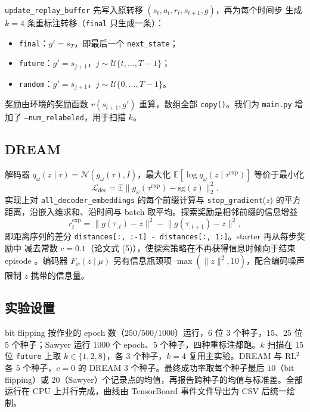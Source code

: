 \documentclass[10pt,twocolumn,a4paper]{ctexart}
\begin{document}
\texttt{update\_replay\_buffer} 先写入原转移 $(s_t,a_t,r_t,s_{t+1},g)$，再为每个时间步
生成 $k=4$ 条重标注转移（\texttt{final} 只生成一条）：
\begin{itemize}
\item \texttt{final}：$g'=s_{T}$，即最后一个 \texttt{next\_state}；
\item \texttt{future}：$g'=s_{j+1}$，$j\sim\mathcal{U}\{t,\ldots,T-1\}$；
\item \texttt{random}：$g'=s_{j+1}$，$j\sim\mathcal{U}\{0,\ldots,T-1\}$。
\end{itemize}
奖励由环境的奖励函数 $r(s_{t+1},g')$ 重算，数组全部 \texttt{copy()}。我们为
\texttt{main.py} 增加了 \texttt{--num\_relabeled}，用于扫描 $k$。

\subsection{DREAM}
解码器 $q_\omega(z\mid\tau)=\mathcal{N}(g_\omega(\tau),I)$，最大化
$\mathbb{E}[\log q_\omega(z\mid\tau^{\exp})]$ 等价于最小化
\begin{equation}
\mathcal{L}_{\mathrm{dec}}=\mathbb{E}\bigl\lVert g_\omega(\tau^{\exp})-\mathrm{sg}(z)\bigr\rVert_2^2 .
\end{equation}
实现上对 \texttt{all\_decoder\_embeddings} 的每个前缀计算与 \texttt{stop\_gradient}($z$)
的平方距离，沿嵌入维求和、沿时间与 batch 取平均。探索奖励是相邻前缀的信息增益
\begin{equation}
r_t^{\exp}=\lVert g(\tau_{:t})-z\rVert^2-\lVert g(\tau_{:t+1})-z\rVert^2 ,
\end{equation}
即距离序列的差分 \texttt{distances[:, :-1] - distances[:, 1:]}。starter 再从每步奖励中
减去常数 $c=0.1$（论文式 (5)），使探索策略在不再获得信息时倾向于结束 episode
\citep{liu2021dream}。编码器 $F_\psi(z\mid\mu)$ 另有信息瓶颈项
$\max(\lVert z\rVert^2,10)$，配合编码噪声限制 $z$ 携带的信息量\citep{alemi2017vib}。

\subsection{实验设置}
bit flipping 按作业的 epoch 数（$250/500/1000$）运行，$6$ 位 $3$ 个种子，$15$、$25$ 位
$5$ 个种子；Sawyer 运行 $1000$ 个 epoch、$5$ 个种子，四种重标注都跑。$k$ 扫描在 $15$ 位
\texttt{future} 上取 $k\in\{1,2,8\}$，各 $3$ 个种子，$k=4$ 复用主实验。DREAM 与 RL$^2$
各 $5$ 个种子，$c=0$ 的 DREAM $3$ 个种子。最终成功率取每个种子最后 $10$（bit
flipping）或 $20$（Sawyer）个记录点的均值，再报告跨种子的均值与标准差。全部运行在
CPU 上并行完成，曲线由 TensorBoard 事件文件导出为 CSV 后统一绘制。
\end{document}
